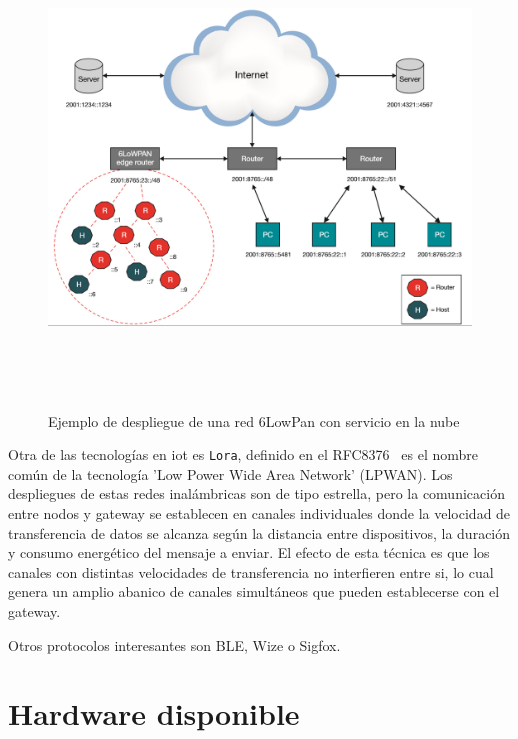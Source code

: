 \begin{figure}[hbt!]
\centering
\label{6Lowpandeploy}
\includegraphics[height=5in]{figures/6LowPanDeploy.png}
\caption[Ejemplo de despliegue de una red 6LowPan con servicio en la nube]{Ejemplo de despliegue de una red 6LowPan con servicio en la nube}
\end{figure}

Otra de las tecnologías en {iot} es \verb|Lora|, definido en el RFC8376~\cite{rfc8376} es el nombre común de la tecnología 'Low Power Wide Area Network' (LPWAN). Los despliegues de estas redes inalámbricas son de tipo estrella, pero la comunicación entre nodos y \gls{gateway} se establecen en canales individuales donde la velocidad de transferencia de datos se alcanza según la distancia entre dispositivos, la duración y consumo energético del mensaje a enviar. El efecto de esta técnica es que los canales con distintas velocidades de transferencia no interfieren entre si, lo cual genera un amplio abanico de canales simultáneos que pueden establecerse con el \gls{gateway}.

Otros protocolos interesantes son BLE, Wize o Sigfox.


\section{Hardware disponible}
\label{ch:Capitulo2.4}

